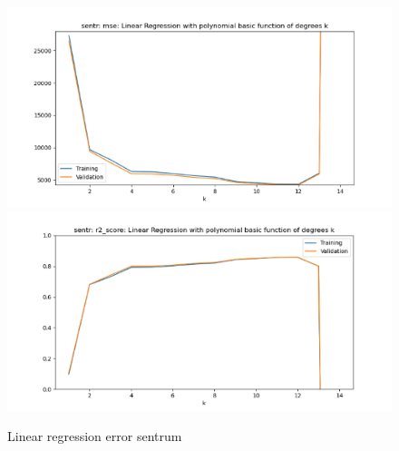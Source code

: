 \documentclass[12pt,a4paper]{scrartcl}		%
\begin{document}
\begin{figure}[h]
    \centering
    \includegraphics[scale = 0.8]{sntr_linreg_mse.png}
    \includegraphics[scale = 0.8]{sntr_linreg_r2.png}
    \caption{Linear regression error sentrum}
    \label{fig::linregstr}
\end{figure}
\end{document}
